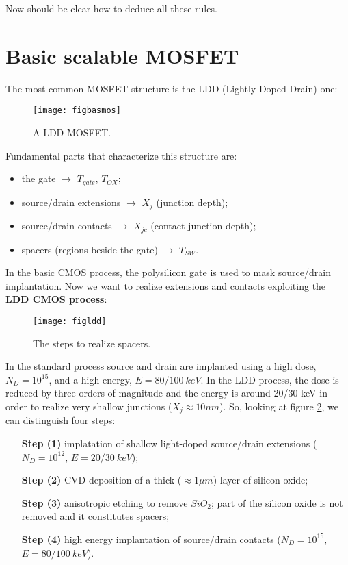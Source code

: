 \documentclass[a4paper, 12pt, twoside, openright]{report}
\begin{document}
Now should be clear how to deduce all these rules.

\newpage

\section{Basic scalable MOSFET}

The most common MOSFET structure is the LDD (Lightly-Doped Drain) one:

	\begin{figure}[H]
	\centering
	\texttt{[image: figbasmos]}
	\caption{A LDD MOSFET.}
	\label{}
	\end{figure}

Fundamental parts that characterize this structure are:

\begin{itemize}
\item the gate $\rightarrow$ $T_{gate}$, $T_{OX}$;
\item source/drain extensions $\rightarrow $ $X_{j}$ (junction depth);
\item source/drain contacts $\rightarrow$ $X_{jc}$ (contact junction depth);
\item spacers (regions beside the gate) $\rightarrow$ $T_{SW}$.
\end{itemize}

In the basic CMOS process, the polysilicon gate is used to mask source/drain implantation. Now we want to realize extensions and contacts exploiting the \textbf{LDD CMOS process}:

	\begin{figure}[H]
	\centering
	\texttt{[image: figldd]}
	\caption{The steps to realize spacers.}
	\label{LDD_process}
	\end{figure}

In the standard process source and drain are implanted using a high dose, $N_D = 10^{15}$, and a high energy, $E = 80/100\ keV$. In the LDD process, the dose is reduced by three orders of magnitude and the energy is around 20/30 keV in order to realize very shallow junctions ($X_j \approx 10 nm$). So, looking at figure \ref{LDD_process}, we can distinguish four steps:

\begin{enumerate}
\item [\textbf{Step (1)}] implatation of shallow light-doped source/drain extensions ($N_D = 10^{12}$, $E = 20/30\ keV$);
\item [\textbf{Step (2)}] CVD deposition of a thick ($\approx 1\mu m$) layer of silicon oxide;
\item [\textbf{Step (3)}] anisotropic etching to remove $SiO_{2}$; part of the silicon oxide is not removed and it constitutes spacers;
\item [\textbf{Step (4)}] high energy implantation of source/drain contacts ($N_D = 10^{15}$, $E = 80/100\ keV$).
\end{enumerate}
\end{document}
